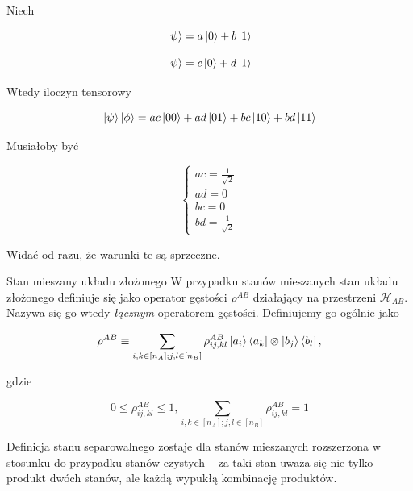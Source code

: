 \documentclass{beamer}
\begin{document}
\begin{frame}
    Niech

    $$
        \ket{\psi} = a \ket{0} + b \ket{1}
    $$

    $$
        \ket{\psi} = c \ket{0} + d \ket{1}
    $$

    Wtedy iloczyn tensorowy

    $$
        \ket{\psi} \ket{\phi} = ac \ket{00} + ad \ket{01} + bc \ket{10} + bd \ket{11}
    $$
\end{frame}

\begin{frame}
    Musiałoby być

    $$
        \begin{cases}
            ac = \frac{1}{\sqrt{2}} \\
            ad = 0 \\
            bc = 0 \\
            bd = \frac{1}{\sqrt{2}}
        \end{cases}
    $$

    Widać od razu, że warunki te są sprzeczne.
\end{frame}

\begin{frame}
    \begin{exampleblock}{Stan mieszany układu złożonego}
        W przypadku stanów mieszanych stan układu złożonego definiuje się jako operator gęstości $\rho^{AB}$ działający na przestrzeni $\mathcal{H}_{AB}$. Nazywa się go wtedy \textit{łącznym} operatorem gęstości. Definiujemy go ogólnie jako

        $$
            \rho ^ {AB} \equiv \sum \limits_{i, k \in [n_{A}]; j, l \in [n_{B}]} \rho_{ij, kl} ^ {AB} \ket{a_{i}} \bra{a_{k}} \otimes \ket{b_{j}} \bra{b_{l}},
        $$

        gdzie

        $$
            0 \leq \rho_{ij, kl} ^ {AB} \leq 1, \sum \limits_{i, k \in [n_{A}]; j, l \in [n_{B}]} \rho_{ij, kl} ^ {AB} = 1
        $$
    \end{exampleblock}
\end{frame}

\begin{frame}
    Definicja stanu separowalnego zostaje dla stanów mieszanych rozszerzona w stosunku do przypadku stanów czystych -- za taki stan uważa się nie tylko produkt dwóch stanów, ale każdą wypukłą kombinację produktów.
\end{frame}
\end{document}
